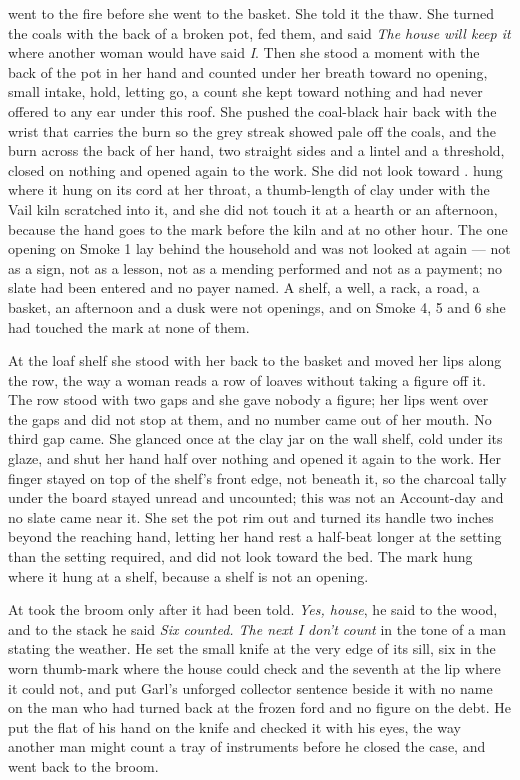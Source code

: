 \scenebreak

 went to the fire before she went to the basket. She told it the thaw. She turned the coals with the back of a broken pot, fed them, and said \emph{The house will keep it} where another woman would have said \emph{I}. Then she stood a moment with the back of the pot in her hand and counted under her breath toward no opening, small intake, hold, letting go, a count she kept toward nothing and had never offered to any ear under this roof. She pushed the coal-black hair back with the wrist that carries the burn so the grey streak showed pale off the coals, and the burn across the back of her hand, two straight sides and a lintel and a threshold, closed on nothing and opened again to the work. She did not look toward .  hung where it hung on its cord at her throat, a thumb-length of clay under  with the Vail kiln scratched into it, and she did not touch it at a hearth or an afternoon, because the hand goes to the mark before the kiln and at no other hour. The one opening on Smoke 1 lay behind the household and was not looked at again --- not as a sign, not as a lesson, not as a mending performed and not as a payment; no slate had been entered and no payer named. A shelf, a well, a rack, a road, a basket, an afternoon and a dusk were not openings, and on Smoke 4, 5 and 6 she had touched the mark at none of them.

At the loaf shelf she stood with her back to the basket and moved her lips along the row, the way a woman reads a row of loaves without taking a figure off it. The row stood with two gaps and she gave nobody a figure; her lips went over the gaps and did not stop at them, and no number came out of her mouth. No third gap came. She glanced once at the clay jar on the wall shelf, cold under its glaze, and shut her hand half over nothing and opened it again to the work. Her finger stayed on top of the shelf's front edge, not beneath it, so the charcoal tally under the board stayed unread and uncounted; this was not an Account-day and no slate came near it. She set the pot rim out and turned its handle two inches beyond the reaching hand, letting her hand rest a half-beat longer at the setting than the setting required, and did not look toward the bed. The mark hung where it hung at a shelf, because a shelf is not an opening.

\scenebreak

At   took the broom only after it had been told. \emph{Yes, house}, he said to the wood, and to the stack he said \emph{Six counted. The next I don't count} in the tone of a man stating the weather. He set the small knife at the very edge of its sill, six in the worn thumb-mark where the house could check and the seventh at the lip where it could not, and put Garl's unforged collector sentence beside it with no name on the man who had turned back at the frozen ford and no figure on the debt. He put the flat of his hand on the knife and checked it with his eyes, the way another man might count a tray of instruments before he closed the case, and went back to the broom.

